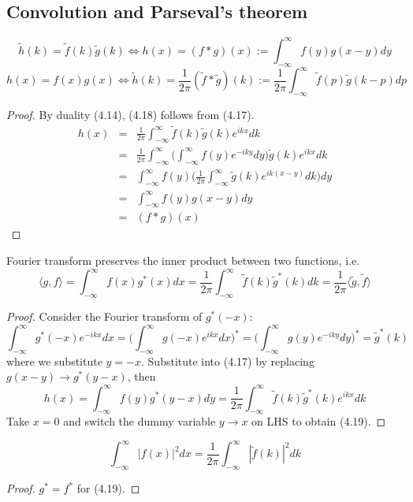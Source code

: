 \documentclass[a4paper]{article}
\begin{document}
\subsection{Convolution and Parseval's theorem}
\begin{thm}
\begin{equation}
\tilde{h}(k)=\tilde{f}(k)\tilde{g}(k)\iff h(x)=(f*g)(x):=\int_{-\infty}^\infty f(y)g(x-y)dy\tag{4.17}
\end{equation}
\begin{equation}
h(x)=f(x)g(x)\iff\tilde{h}(k)=\frac{1}{2\pi}(\tilde{f}*\tilde{g})(k):=\frac{1}{2\pi}\int_{-\infty}^\infty\tilde{f}(p)\tilde{g}(k-p)dp\tag{4.18}
\end{equation}
\end{thm}
\begin{proof}
By duality (4.14), (4.18) follows from (4.17).
\begin{eqnarray}
h(x)&=&\frac{1}{2\pi}\int_{-\infty}^\infty\tilde{f}(k)\tilde{g}(k)e^{ikx}dk\nonumber\\&=&\frac{1}{2\pi}\int_{-\infty}^\infty\bigg(\int_{-\infty}^\infty f(y)e^{-iky}dy\bigg)\tilde{g}(k)e^{ikx}dk\nonumber\\&=&\int_{-\infty}^\infty f(y)\bigg(\frac{1}{2\pi}\int_{-\infty}^\infty\tilde{g}(k)e^{ik(x-y)}dk\bigg)dy\nonumber\\&=&\int_{-\infty}^\infty f(y)g(x-y)dy\nonumber\\&=&(f*g)(x)\nonumber
\end{eqnarray}
\end{proof}
\begin{prop} Fourier transform preserves the inner product between two functions, i.e.
\begin{equation}
    \langle g,f\rangle=\int_{-\infty}^\infty f(x)g^*(x)dx=\frac{1}{2\pi}\int_{-\infty}^\infty\tilde{f}(k)\tilde{g}^*(k)dk=\frac{1}{2\pi}\langle\tilde{g},\tilde{f}\rangle\tag{4.19}
\end{equation}
\end{prop}
\begin{proof}
Consider the Fourier transform of $g^*(-x)$:
$$\int_{-\infty}^\infty g^*(-x)e^{-ikx}dx=\bigg(\int_{-\infty}^\infty g(-x)e^{ikx}dx\bigg)^*=\bigg(\int_{-\infty}^\infty g(y)e^{-iky}dy\bigg)^*=\tilde{g}^*(k)$$
where we substitute $y=-x$. Substitute into (4.17) by replacing $g(x-y)\rightarrow g^*(y-x)$, then 
$$h(x)=\int_{-\infty}^\infty f(y)g^*(y-x)dy=\frac{1}{2\pi}\int_{-\infty}^\infty\tilde{f}(k)\tilde{g}^*(k)e^{ikx}dk$$
Take $x=0$ and switch the dummy variable $y\rightarrow x$ on LHS to obtain (4.19).
\end{proof}
\begin{cor}
\begin{equation}
    \int_{-\infty}^\infty|f(x)|^2dx=\frac{1}{2\pi}\int_{-\infty}^\infty|\tilde{f}(k)|^2dk\tag{4.20}
\end{equation}
\end{cor}
\begin{proof}
$g^*=f^*$ for (4.19).
\end{proof}
\newpage
\end{document}

